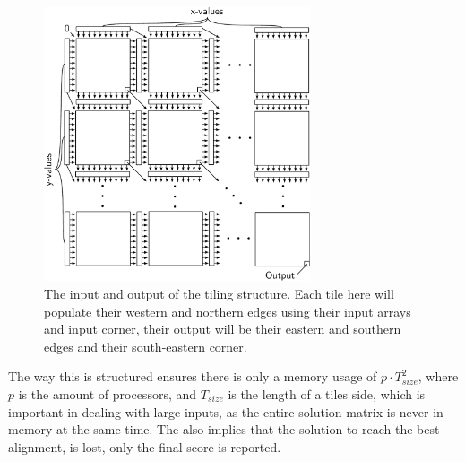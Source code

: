 \begin{figure}[H]
  \center
  \includegraphics[width=0.7\textwidth]{fig/fig1.pdf}
  \caption{The input and output of the tiling structure. Each tile here will populate their western and northern edges using their input arrays and input corner, their output will be their eastern and southern edges and their south-eastern corner.}
  \label{fig1}
\end{figure}
The way this is structured ensures there is only a memory usage of $p\cdot T_{size}^2$, where $p$ is the amount of processors, and $T_{size}$ is the length of a tiles side, which is important in dealing with large inputs, as the entire solution matrix is never in memory at the same time. The also implies that the solution to reach the best alignment, is lost, only the final score is reported.
